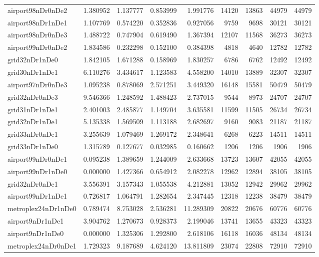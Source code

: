\begin{longtable}{|l|r|r|r|r|r|r|r|r|}
airport98nDr0nDe2 & 1.380952 & 1.137777 & 0.853999 & 1.991776 & 14120 & 13863 & 44979 & 44979 \\
airport98nDr1nDe1 & 1.107769 & 0.574220 & 0.352836 & 0.927056 & 9759 & 9698 & 30121 & 30121 \\
airport98nDr0nDe3 & 1.488722 & 0.747904 & 0.619490 & 1.367394 & 12107 & 11568 & 36273 & 36273 \\
airport99nDr0nDe2 & 1.834586 & 0.232298 & 0.152100 & 0.384398 & 4818 & 4640 & 12782 & 12782 \\
grid32nDr1nDe0 & 1.842105 & 1.671288 & 0.158969 & 1.830257 & 6786 & 6762 & 12492 & 12492 \\
grid30nDr1nDe1 & 6.110276 & 3.434617 & 1.123583 & 4.558200 & 14010 & 13889 & 32307 & 32307 \\
airport97nDr0nDe3 & 1.095238 & 0.878069 & 2.571251 & 3.449320 & 16148 & 15581 & 50479 & 50479 \\
grid32nDr0nDe3 & 9.546366 & 1.248592 & 1.488423 & 2.737015 & 9544 & 8973 & 24707 & 24707 \\
grid31nDr1nDe1 & 2.401003 & 2.485877 & 1.149704 & 3.635581 & 11599 & 11505 & 26734 & 26734 \\
grid32nDr1nDe1 & 5.135338 & 1.569509 & 1.113188 & 2.682697 & 9160 & 9083 & 21187 & 21187 \\
grid33nDr0nDe1 & 3.255639 & 1.079469 & 1.269172 & 2.348641 & 6268 & 6223 & 14511 & 14511 \\
grid33nDr1nDe0 & 1.315789 & 0.127677 & 0.032985 & 0.160662 & 1206 & 1206 & 1906 & 1906 \\
airport99nDr0nDe1 & 0.095238 & 1.389659 & 1.244009 & 2.633668 & 13723 & 13607 & 42055 & 42055 \\
airport99nDr1nDe0 & 0.000000 & 1.427366 & 0.654912 & 2.082278 & 12962 & 12894 & 38105 & 38105 \\
grid32nDr0nDe1 & 3.556391 & 3.157343 & 1.055538 & 4.212881 & 13052 & 12942 & 29962 & 29962 \\
airport99nDr1nDe1 & 0.726817 & 1.064791 & 1.282654 & 2.347445 & 12318 & 12238 & 38479 & 38479 \\
metroplex24nDr1nDe0 & 0.789474 & 8.753028 & 2.536281 & 11.289309 & 20822 & 20676 & 60776 & 60776 \\
airport9nDr1nDe1 & 3.904762 & 1.270673 & 0.928373 & 2.199046 & 13741 & 13655 & 43323 & 43323 \\
airport9nDr1nDe0 & 0.000000 & 1.325306 & 1.292800 & 2.618106 & 16118 & 16036 & 48134 & 48134 \\
metroplex24nDr0nDe1 & 1.729323 & 9.187689 & 4.624120 & 13.811809 & 23074 & 22808 & 72910 & 72910 \\

\end{longtable}
